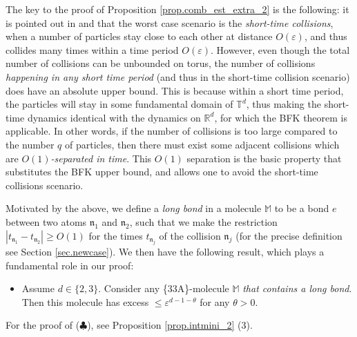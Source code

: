 \documentclass[10pt, reqno]{amsart}
\newcommand{\Mb}{\mathbb M}
\newcommand{\Rb}{\mathbb R}
\newcommand{\Tb}{\mathbb T}
\newcommand{\nf}{\mathfrak n}
\theoremstyle{definition}
\theoremstyle{remark}
\numberwithin{equation}{section}
\begin{document}
\smallskip
The key to the proof of Proposition \ref{prop.comb_est_extra_2} is the following: it is pointed out in \cite{GST14} and \cite{DHM24} that the worst case scenario is the \emph{short-time collisions}, when a number of particles stay close to each other at distance $O(\varepsilon)$, and thus collides many times within a time period $O(\varepsilon)$. However, even though the total number of collisions can be unbounded on torus, the number of collisions \emph{happening in any short time period} (and thus in the short-time collision scenario) does have an absolute upper bound. This is because within a short time period, the particles will stay in some fundamental domain of $\Tb^d$, thus making the short-time dynamics identical with the dynamics on $\Rb^d$, for which the BFK theorem is applicable. In other words, if the number of collisions is too large compared to the number $q$ of particles, then there must exist some adjacent collisions which are \emph{$O(1)$-separated in time}. This $O(1)$ separation is the basic property that substitutes the BFK upper bound, and allows one to avoid the short-time collisions scenario.

Motivated by the above, we define a \emph{long bond} in a molecule $\Mb$ to be a bond $e$ between two atoms $\nf_1$ and $\nf_2$, such that we make the restriction $|t_{\nf_1}-t_{\nf_2}|\geq O(1)$ for the times $t_{\nf_j}$ of the collision $\nf_j$ (for the precise definition see Section \ref{sec.newcase}). We then have the following result, which plays a fundamental role in our proof:
\begin{itemize}
\item[($\clubsuit$)] Assume $d\in\{2,3\}$. Consider any \{33A\}-molecule $\Mb$ \emph{that contains a long bond}. Then this molecule has excess $\leq \varepsilon^{d-1-\theta}$ for any $\theta>0$.
\end{itemize} For the proof of ($\clubsuit$), see Proposition \ref{prop.intmini_2} (3). 
\end{document}
